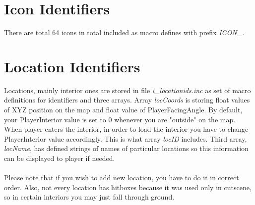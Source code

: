 \documentclass{article}
\begin{document}
\section{Icon Identifiers}
There are total 64 icons in total included as macro defines with prefix \textit{ICON\_}. 


\section{Location Identifiers}
Locations, mainly interior ones are stored in file \textit{i\_locationids.inc} as set of macro definitions for identifiers and three arrays. Array \textit{locCoords} is storing float values of XYZ position on the map and float value of PlayerFacingAngle. By default, your PlayerInterior value is set to 0 whenever you are "outside" on the map. When player enters the interior, in order to load the interior you have to change PlayerInterior value accordingly. This is what array \textit{locID} includes. Third array, \textit{locName}, has defined strings of names of particular locations so this information can be displayed to player if needed.\\
\\
Please note that if you wish to add new location, you have to do it in correct order. Also, not every location has hitboxes because it was used only in cutscene, so in certain interiors you may just fall through ground.
\end{document}
